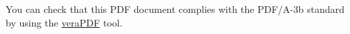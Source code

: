 \documentclass{article}
\begin{document}
You can check that this PDF document complies with the PDF/A-3b standard by using the \href{https://verapdf.org/}{veraPDF} tool. 
\end{document}
